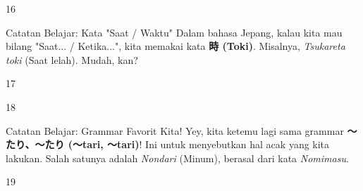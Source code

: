 \begin{convobox}{16}
    \noindent
      
      

    \vspace{1.5em}
\end{convobox}

\begin{lessonbox}{Catatan Belajar: Kata "Saat / Waktu"}
    Dalam bahasa Jepang, kalau kita mau bilang "Saat... / Ketika...", kita memakai kata \textbf{時 (Toki)}. Misalnya, \textit{Tsukareta toki} (Saat lelah). Mudah, kan?
\end{lessonbox}

\begin{convobox}{17}
    \noindent
      

    \vspace{1.5em}
\end{convobox}

\begin{convobox}{18}
    \noindent
      

    \vspace{1.5em}
\end{convobox}

\begin{lessonbox}{Catatan Belajar: Grammar Favorit Kita!}
    Yey, kita ketemu lagi sama grammar \textbf{〜たり、〜たり (〜tari, 〜tari)}! Ini untuk menyebutkan hal acak yang kita lakukan. Salah satunya adalah \textit{Nondari} (Minum), berasal dari kata \textit{Nomimasu}.
\end{lessonbox}

\begin{convobox}{19}
    \noindent
      

    \vspace{1.5em}
\end{convobox}


